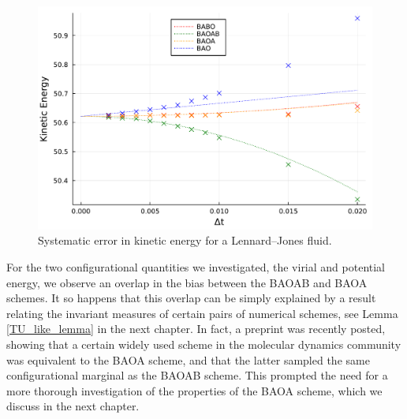   \begin{figure}[htbp]
    \begin{center}
      \includegraphics[width=0.7\linewidth]{figures/chapter1/kinetic_energy_bias.pdf}
      \caption{ \label{fig:kinetic_energy_bias}
        Systematic error in kinetic energy for a Lennard--Jones fluid.
      }
    \end{center}
  \end{figure}
For the two configurational quantities we investigated, the virial and potential energy, we observe an overlap in the bias between the BAOAB and BAOA schemes.
It so happens that this overlap can be simply explained by a result relating the invariant measures of certain pairs of numerical schemes, see Lemma \ref{TU_like_lemma} in the next chapter.
In fact, a preprint \cite{KK22} was recently posted, showing that a certain widely used scheme in the molecular dynamics community was equivalent to the BAOA scheme, and that the latter sampled the same configurational marginal as the BAOAB scheme.
This prompted the need for a more thorough investigation of the properties of the BAOA scheme, which we discuss in the next chapter.